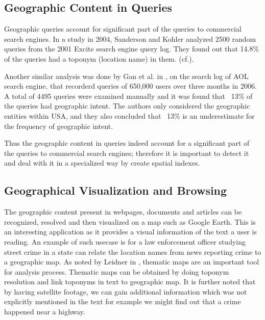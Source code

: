 \documentclass[
     11pt,         %
     a4paper,      %
     oneside,
     ]{article}
\begin{document}
\subsection{Geographic Content in Queries}
Geographic queries account for significant part of the queries to commercial search engines. In a study in 2004, Sanderson and Kohler analyzed 2500 random queries from the 2001 Excite search engine query log. They found out that 14.8\% of the queries had a toponym (location name) in them. \cite{Sanderson04analyzinggeographic}  (cf.\cite{Leidner:2008:PhD}).

Another similar analysis was done by Gan et al. in \cite{Gan:2008:AGQ:1367798.1367806}, on the search log of AOL search engine, that recorderd queries of 650,000 users over three months in 2006. A total of 4495 queries were examined manually and it was found that ~13\% of the queries had geographic intent. The authors only considered the geographic entities within USA, and they also concluded that ~13\% is an underestimate for the frequency of geographic intent. 

Thus the geographic content in queries indeed account for a significant part of the queries to commercial search engines; therefore it is important to detect it and deal with it in a specialized way by create spatial indexes.


\subsection{Geographical Visualization and Browsing} The geographic content present in webpages, documents and articles can be recognized, resolved and then visualized on a map such as Google Earth. This is an interesting application as it provides a visual information of the text a user is reading. An example of such usecase is for a law enforcement officer studying street crime in a state can relate the location names from news reporting crime to a geographic map. As noted by Leidner in \cite{Leidner:2008:PhD}, thematic maps are an important tool for analysis process. Thematic maps can be obtained by doing toponym resolution and link toponyms in text to geographic map. It is further noted that by having satellite footage, we can gain additional information which was not explicitly mentioned in the text for example we might find out that a crime happened near a highway.
 
\end{document}
